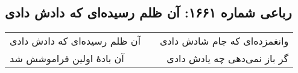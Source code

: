 \begin{center}
\section*{رباعی شماره ۱۶۶۱: آن ظلم رسیده‌ای که دادش دادی}
\label{sec:1661}
\begin{longtable}{l p{0.5cm} r}
آن ظلم رسیده‌ای که دادش دادی
&&
وانغمزده‌ای که جام شادش دادی
\\
آن بادهٔ اولین فراموشش شد
&&
گر باز نمی‌دهی چه یادش دادی
\\
\end{longtable}
\end{center}
